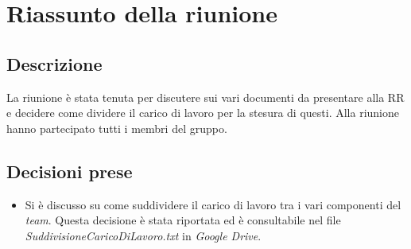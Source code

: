 \section{Riassunto della riunione}
\subsection{Descrizione}

La riunione è stata tenuta per discutere sui vari documenti da presentare alla RR e decidere come dividere il carico di lavoro per la stesura di questi. Alla riunione hanno partecipato tutti i membri del gruppo.

\subsection{Decisioni prese}
\begin{itemize}
\item Si è discusso su come suddividere il carico di lavoro tra i vari componenti del \textit{team}. Questa decisione è stata riportata ed è consultabile nel file \textit{SuddivisioneCaricoDiLavoro.txt} in \textit{Google Drive}.
\end{itemize}
